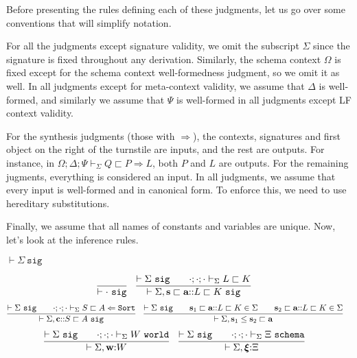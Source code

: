 \documentclass[letterpaper, 11pt]{article}
\newcommand{\Rar}{\Rightarrow}
\newcommand{\Lar}{\Leftarrow}
\newcommand{\Sort}{\texttt{Sort}}
\newcommand{\world}{\texttt{world}}
\newcommand{\schema}{\texttt{schema}}
\newcommand{\sig}{\texttt{sig}}
\begin{document}
    Before presenting the rules defining each of these judgments, let us go over some conventions that will simplify notation.
    
    For all the judgments except signature validity, we omit the subscript $\Sigma$ since the signature is fixed throughout any derivation.
    Similarly, the schema context $\Omega$ is fixed except for the schema context well-formedness judgment, so we omit it as well.  In all judgments
    except for meta-context validity, we assume that $\Delta$ is well-formed, and similarly we assume that $\Psi$ is well-formed in all judgments
    except LF context validity.  

    For the synthesis judgments (those with $\Rar$), the contexts, signatures and first object on the right of the turnstile
    are inputs, and the rest are outputs.  For instance, in $\Omega; \Delta; \Psi \vdash_\Sigma Q \sqsubset P \Rar L$, both $P$ and $L$ are outputs.
    For the remaining jugments, everything is considered an input.  In all judgments, we assume that every input is well-formed and in canonical form.
    To enforce this, we need to use hereditary substitutions.

    Finally, we assume that all names of constants and variables are unique.  Now, let's look at the inference rules.
    
    $\boxed{\vdash \Sigma \ \sig}$
    
    \begin{align*}
        & \infer{\vdash \cdot \ \sig}{} &
        & \infer{\vdash \Sigma, \textbf{s} \sqsubset \textbf{a} {::} L \sqsubset K \ \sig}
          {
            \vdash \Sigma \ \sig
            &&
            \cdot ; \cdot ; \cdot \vdash_\Sigma L \sqsubset K
          }
    \end{align*}
    \begin{align*}
        & \infer{\vdash \Sigma, \textbf{c} {::} S \sqsubset A \ \sig}
          {
            \vdash \Sigma \ \sig
            &&
            \cdot ; \cdot ; \cdot \vdash_\Sigma S \sqsubset A \Lar \Sort
          } &
        & \infer{\vdash \Sigma, \textbf{s}_1 \leq \textbf{s}_2 \sqsubset \textbf{a}}
          {
            \vdash \Sigma \ \sig
            &&
            \textbf{s}_1 \sqsubset \textbf{a} {::} L \sqsubset K \in \Sigma
            &&
            \textbf{s}_2 \sqsubset \textbf{a} {::} L \sqsubset K \in \Sigma
          }
    \end{align*}
    \begin{align*}
        & \infer{\vdash \Sigma , \textbf{w} {:} W}
          {
            \vdash \Sigma \ \sig
            &&
            \cdot ; \cdot ; \cdot \vdash_\Sigma W \ \world
          } &
        & \infer{\vdash \Sigma , \boldsymbol{\xi} {:} \Xi}
          {
            \vdash \Sigma \ \sig
            &&
            \cdot ; \cdot ; \cdot \vdash_\Sigma \Xi \ \schema
          } &
    \end{align*}
\end{document}
